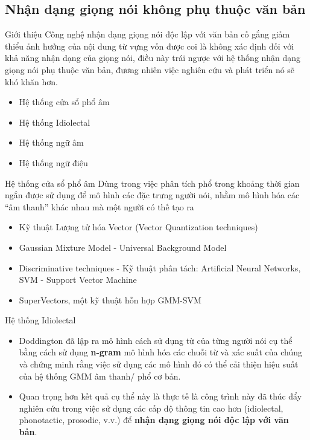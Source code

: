 \documentclass[notheorems, aspectratio=54]{beamer}
\begin{document}
\subsection{Nhận dạng giọng nói không phụ thuộc văn bản}
\begin{frame}{Giới thiệu}
	\qquad Công nghệ nhận dạng giọng nói độc lập với văn bản cố gắng giảm thiểu ảnh hưởng của nội dung từ vựng vốn được coi là không xác định đối với khả năng nhận dạng của giọng nói, điều này trái ngược với hệ thống nhận dạng giọng nói phụ thuộc văn bản, đương nhiên việc nghiên cứu và phát triển nó sẽ khó khăn hơn.
	\begin{itemize}
		\item Hệ thống cửa sổ phổ âm
		\item Hệ thống Idiolectal
		\item Hệ thống ngữ âm
		\item Hệ thống ngữ điệu
	\end{itemize}
\end{frame}
\begin{frame}{Hệ thống cửa sổ phổ âm}
	Dùng trong việc phân tích phổ trong khoảng thời gian ngắn được sử dụng để mô hình các đặc trưng người nói, nhằm mô hình hóa các “âm thanh” khác nhau mà một người có thế tạo ra
	\begin{itemize}
		\item Kỹ thuật Lượng tử hóa Vector (Vector Quantization techniques)
		\item Gaussian Mixture Model - Universal Background Model
		\item Discriminative techniques - Kỹ thuật phân tách: Artificial Neural Networks, SVM - Support Vector Machine
		\item SuperVectors, một kỹ thuật hỗn hợp GMM-SVM
	\end{itemize}
\end{frame}
\begin{frame}{Hệ thống Idiolectal}
	\begin{itemize}
		\item Doddington đã lập ra mô hình cách sử dụng từ của từng người nói cụ thể bằng cách sử dụng \textbf{n-gram} mô hình hóa các chuỗi từ và xác suất của chúng và chứng minh rằng việc sử dụng các mô hình đó có thể cải thiện hiệu suất của hệ thống GMM âm thanh/ phổ cơ bản. 
		\item Quan trọng hơn kết quả cụ thể này là thực tế là công trình này đã thúc đẩy nghiên cứu trong việc sử dụng các cấp độ thông tin cao hơn (idiolectal, phonotactic, prosodic, v.v.) để \textbf{nhận dạng giọng nói độc lập với văn bản}. 
	\end{itemize}
\end{frame}
\end{document}
